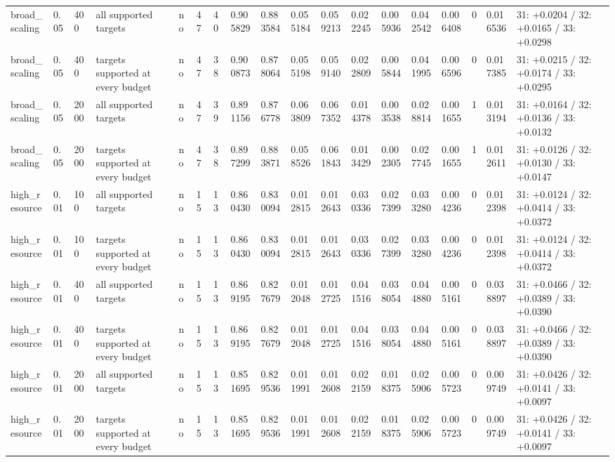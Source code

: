 \begin{tabular}{llllllllllllllllll}
broad\_scaling & 0.05 & 400 & all supported targets & no & 47 & 40 & 0.905829 & 0.883584 & 0.055184 & 0.059213 & 0.022245 & 0.005936 & 0.042542 & 0.006408 & 0 & 0.016536 & 31: +0.0204 / 32: +0.0165 / 33: +0.0298 \\
broad\_scaling & 0.05 & 400 & targets supported at every budget & no & 47 & 38 & 0.900873 & 0.878064 & 0.055198 & 0.059140 & 0.022809 & 0.005844 & 0.041995 & 0.006596 & 0 & 0.017385 & 31: +0.0215 / 32: +0.0174 / 33: +0.0295 \\
broad\_scaling & 0.05 & 2000 & all supported targets & no & 47 & 39 & 0.891156 & 0.876778 & 0.063809 & 0.067352 & 0.014378 & 0.003538 & 0.028814 & 0.001655 & 1 & 0.013194 & 31: +0.0164 / 32: +0.0136 / 33: +0.0132 \\
broad\_scaling & 0.05 & 2000 & targets supported at every budget & no & 47 & 38 & 0.897299 & 0.883871 & 0.058526 & 0.061843 & 0.013429 & 0.002305 & 0.027745 & 0.001655 & 1 & 0.012611 & 31: +0.0126 / 32: +0.0130 / 33: +0.0147 \\
high\_resource & 0.01 & 100 & all supported targets & no & 15 & 13 & 0.860430 & 0.830094 & 0.012815 & 0.012643 & 0.030336 & 0.027399 & 0.033280 & 0.004236 & 0 & 0.012398 & 31: +0.0124 / 32: +0.0414 / 33: +0.0372 \\
high\_resource & 0.01 & 100 & targets supported at every budget & no & 15 & 13 & 0.860430 & 0.830094 & 0.012815 & 0.012643 & 0.030336 & 0.027399 & 0.033280 & 0.004236 & 0 & 0.012398 & 31: +0.0124 / 32: +0.0414 / 33: +0.0372 \\
high\_resource & 0.01 & 400 & all supported targets & no & 15 & 13 & 0.869195 & 0.827679 & 0.012048 & 0.012725 & 0.041516 & 0.038054 & 0.044880 & 0.005161 & 0 & 0.038897 & 31: +0.0466 / 32: +0.0389 / 33: +0.0390 \\
high\_resource & 0.01 & 400 & targets supported at every budget & no & 15 & 13 & 0.869195 & 0.827679 & 0.012048 & 0.012725 & 0.041516 & 0.038054 & 0.044880 & 0.005161 & 0 & 0.038897 & 31: +0.0466 / 32: +0.0389 / 33: +0.0390 \\
high\_resource & 0.01 & 2000 & all supported targets & no & 15 & 13 & 0.851695 & 0.829536 & 0.011991 & 0.012608 & 0.022159 & 0.018375 & 0.025906 & 0.005723 & 0 & 0.009749 & 31: +0.0426 / 32: +0.0141 / 33: +0.0097 \\
high\_resource & 0.01 & 2000 & targets supported at every budget & no & 15 & 13 & 0.851695 & 0.829536 & 0.011991 & 0.012608 & 0.022159 & 0.018375 & 0.025906 & 0.005723 & 0 & 0.009749 & 31: +0.0426 / 32: +0.0141 / 33: +0.0097 \\

\end{tabular}
